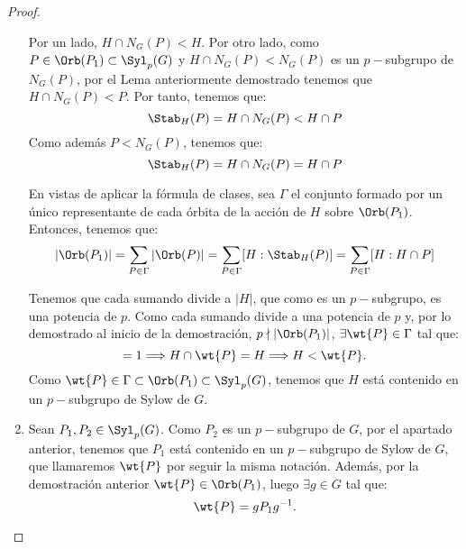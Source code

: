 \begin{ejercicio}
\begin{teo}
\begin{proof}
\begin{enumerate}
                Por un lado, $H\cap N_G(P)<H$. Por otro lado, como $P\in \Orb(P_1)\subset \Syl_p(G)$ y $H\cap N_G(P)<N_G(P)$ es un $p-$subgrupo de \(N_G(P)\), por el Lema anteriormente demostrado tenemos que $H\cap N_G(P)<P$. Por tanto, tenemos que:
                \begin{equation*}
                    \Stab_{H}(P) = H\cap N_G(P) < H\cap P
                \end{equation*}
                Como además $P<N_G(P)$, tenemos que:
                \begin{equation*}
                    \Stab_{H}(P) = H\cap N_G(P) = H\cap P
                \end{equation*}

                En vistas de aplicar la fórmula de clases, sea $\Gamma$ el conjunto formado por un único representante de cada órbita de la acción de \(H\) sobre \(\Orb(P_1)\). Entonces, tenemos que:
                \begin{equation}\label{eq:orbita2}
                    |\Orb(P_1)| = \sum_{P\in \Gamma} |\Orb(P)|
                    = \sum_{P\in \Gamma} [H:\Stab_{H}(P)]
                    = \sum_{P\in \Gamma} [H:H\cap P]
                \end{equation}

                Tenemos que cada sumando divide a $|H|$, que como es un \(p-\)subgrupo, es una potencia de \(p\). Como cada sumando divide a una potencia de $p$ y, por lo demostrado al inicio de la demostración, $p\nmid |\Orb(P_1)|$, $\exists \wt{P}\in \Gamma$ tal que:
                \begin{equation*}
                    [H:H\cap \wt{P}] = 1 \Longrightarrow H\cap \wt{P} = H\Longrightarrow H< \wt{P}.
                \end{equation*}
                Como $\wt{P}\in \Gamma\subset \Orb(P_1)\subset \Syl_p(G)$, tenemos que \(H\) está contenido en un \(p-\)subgrupo de Sylow de \(G\).

                \item Sean \(P_1, P_2\in \Syl_p(G)\). Como $P_2$ es un \(p-\)subgrupo de $G$, por el apartado anterior, tenemos que \(P_1\) está contenido en un \(p-\)subgrupo de Sylow de \(G\), que llamaremos $\wt{P}$ por seguir la misma notación. Además, por la demostración anterior $\wt{P}\in \Orb(P_1)$, luego $\exists g\in G$ tal que:
                \begin{equation*}
                    \wt{P} = gP_1g^{-1}.
                \end{equation*}


\end{enumerate}
\end{proof}
\end{teo}
\end{ejercicio}
